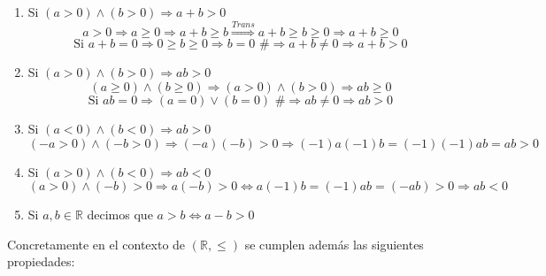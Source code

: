 \documentclass[10pt,a4paper,openright]{book}
\theoremstyle{break}
\begin{document}
\begin{enumerate}
\item Si $(a>0) \wedge (b>0)\Rightarrow a+b>0$
$$a>0\Rightarrow a\geq 0\Rightarrow a+b\geq b \stackrel{Trans}{\Rightarrow} a+b\geq b\geq 0 \Rightarrow a+b\geq 0$$
$$\mbox{Si } a+b=0 \Rightarrow 0\geq b\geq 0\Rightarrow b=0 \mbox{ \#}\Rightarrow a+b\neq 0 \Rightarrow a+b>0$$
\vspace{0.5cm}

\item Si $(a>0)\wedge (b>0)\Rightarrow ab>0$
$$(a\geq 0) \wedge (b\geq 0)\Rightarrow (a>0) \wedge (b>0) \Rightarrow ab\geq 0$$
$$\mbox{Si }ab=0\Rightarrow (a=0)\vee (b=0)\mbox{ \#}\Rightarrow ab\neq 0 \Rightarrow ab>0$$
\vspace{0.5cm}

\item Si $(a<0)\wedge (b<0)\Rightarrow ab>0$
$$(-a>0)\wedge (-b>0)\Rightarrow (-a)(-b)>0\Rightarrow (-1)a(-1)b=(-1)(-1)ab=ab>0$$
\vspace{0.5cm}

\item Si $(a>0)\wedge (b<0)\Rightarrow ab<0$
$$(a>0)\wedge(-b)>0\Rightarrow a(-b)>0\Leftrightarrow a(-1)b=(-1)ab=(-ab)>0\Rightarrow ab<0$$
\vspace{0.5cm}

\item Si $a,b\in \mathbb R$ decimos que $a>b\Leftrightarrow a-b>0$
\end{enumerate}

Concretamente en el contexto de $(\mathbb R, \leq)$ se cumplen además las siguientes propiedades:
\end{document}
